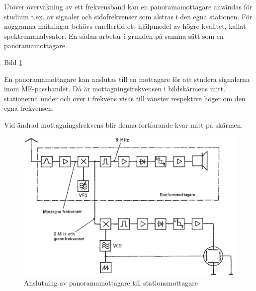 Utöver övervakning av ett frekvensband kan en panoramamottagare
användas för studium t.ex. av signaler och sidofrekvenser som alstras
i den egna stationen. För noggranna mätningar behövs emellertid ett
hjälpmedel av högre kvalitet, kallat spektrumanalysator. En sådan
arbetar i grunden på samma sätt som en panoramamottagare.

Bild \ref{fig:bildII4-16}

En panoramamottagare kan anslutas till en mottagare för att studera
signalerna inom MF-passbandet. Då är mottagningsfrekvensen i
bildskärmens mitt. stationerna under och över i frekvens visas till
vänster respektive höger om den egna frekvensen.

Vid ändrad mottagningsfrekvens blir denna fortfarande kvar mitt på
skärmen.

\begin{figure}
  \includegraphics[width=\textwidth]{images/cropped_pdfs/bild_2_4-16.pdf}
  \caption{Anslutning av panoramamottagare till stationsmottagare}
  \label{fig:bildII4-16}
\end{figure}
